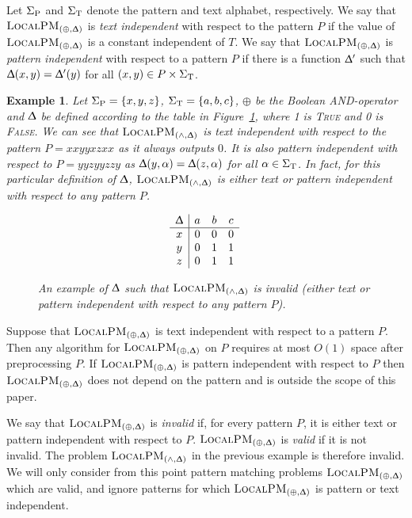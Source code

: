 \documentclass{article}
\renewcommand{\Delta}{\Updelta}
\newcommand{\TRUE}{\textsc{True}\xspace}
\newcommand{\FALSE}{\textsc{False}\xspace}
\newcommand{\SigmaP}{\ensuremath{\Sigma_{\textup{P}}}}
\newcommand{\SigmaT}{\ensuremath{\Sigma_{\textup{T}}}}
\newcommand{\local}{\ensuremath{\textsc{LocalPM}}}
\theoremstyle{plain}
\newtheorem{example}[theorem]{Example}
\theoremstyle{definition}
\begin{document}
Let $\SigmaP$ and $\SigmaT$ denote the pattern and text alphabet, respectively. We say that $\local_{(\oplus,\Delta)}$ is \emph{text independent} with respect to the pattern $P$ if the value of $\local_{(\oplus,\Delta)}$ is a constant independent of $T$. We say that $\local_{(\oplus,\Delta)}$ is \emph{pattern independent} with respect to a pattern $P$ if there is a function $\Delta'$ such that $\Delta(x,y)=\Delta'(y)$ for all $(x,y)\in P\times\SigmaT$.

\begin{example}
    Let $\SigmaP=\left\{ x,y,z\right\} $, $\SigmaT=\left\{ a,b,c\right\} $, $\oplus$ be the Boolean AND-operator and $\Delta$ be defined according to the table in Figure~\ref{fig:example-invalid}, where 1 is \TRUE and 0 is \FALSE. We can see that $\local_{(\wedge,\Delta)}$ is text independent with respect to the pattern $P=xxyyxzxx$ as it always outputs $0$. It is also pattern independent with respect to $P=yyzyyzzy$ as $\Delta(y,\alpha) = \Delta(z,\alpha)$ for all $\alpha\in\SigmaT$. In fact, for this particular definition of $\Delta$, $\local_{(\wedge,\Delta)}$ is either text or pattern independent with respect to any pattern $P$.
\begin{figure}[t]
        \begin{equation*}
            \begin{array}{c|ccc}
                \Delta & a & b & c\\
                \hline x & 0 & 0 & 0\\
                y & 0 & 1 & 1\\
                z & 0 & 1 & 1
            \end{array}\,
        \end{equation*}
        \caption{\label{fig:example-invalid}An example of $\Delta$ such that $\local_{(\wedge,\Delta)}$ is invalid (either text or pattern independent with respect to any pattern $P$).}
    \end{figure}
\end{example}

Suppose that $\local_{(\oplus,\Delta)}$ is text independent with respect to a pattern $P$. Then any algorithm for $\local_{(\oplus,\Delta)}$ on $P$ requires at most $O(1)$ space after preprocessing $P$. If $\local_{(\oplus,\Delta)}$ is pattern independent with respect to $P$ then $\local_{(\oplus,\Delta)}$ does not depend on the pattern and is outside the scope of this paper.

We say that $\local_{(\oplus,\Delta)}$ is \emph{invalid} if, for every pattern $P$, it is either text or pattern independent with respect to $P$. $\local_{(\oplus,\Delta)}$ is \emph{valid} if it is not invalid. The problem $\local_{(\wedge,\Delta)}$ in the previous example is therefore invalid. We will only consider from this point pattern matching problems $\local_{(\oplus,\Delta)}$ which are valid, and ignore patterns for which $\local_{(\oplus,\Delta)}$ is pattern or text independent.
\end{document}
